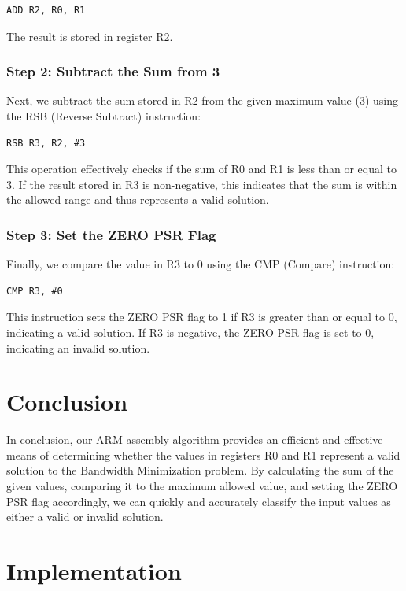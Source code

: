 \begin{verbatim}
ADD R2, R0, R1
\end{verbatim}

The result is stored in register R2.

\subsubsection{Step 2: Subtract the Sum from 3}

Next, we subtract the sum stored in R2 from the given maximum value (3) using the RSB (Reverse Subtract) instruction:

\begin{verbatim}
RSB R3, R2, #3
\end{verbatim}

This operation effectively checks if the sum of R0 and R1 is less than or equal to 3. If the result stored in R3 is non-negative, this indicates that the sum is within the allowed range and thus represents a valid solution.

\subsubsection{Step 3: Set the ZERO PSR Flag}

Finally, we compare the value in R3 to 0 using the CMP (Compare) instruction:

\begin{verbatim}
CMP R3, #0
\end{verbatim}

This instruction sets the ZERO PSR flag to 1 if R3 is greater than or equal to 0, indicating a valid solution. If R3 is negative, the ZERO PSR flag is set to 0, indicating an invalid solution.

\section{Conclusion}

In conclusion, our ARM assembly algorithm provides an efficient and effective means of determining whether the values in registers R0 and R1 represent a valid solution to the Bandwidth Minimization problem. By calculating the sum of the given values, comparing it to the maximum allowed value, and setting the ZERO PSR flag accordingly, we can quickly and accurately classify the input values as either a valid or invalid solution.



\section{Implementation}

